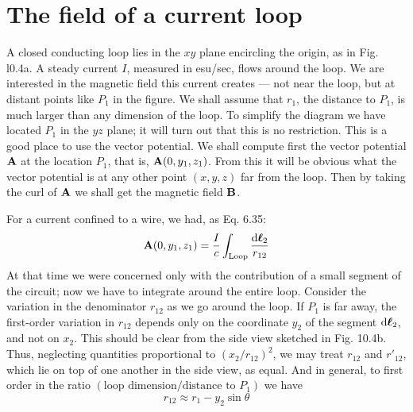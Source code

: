 \section{The field of a current loop}

A closed conducting loop lies in the $xy$ plane encircling the origin,
as in Fig. l0.4a. A steady current $I$, measured in esu/sec, flows
around the loop. We are interested in the magnetic field this current
creates --- not near the loop, but at distant points like $P_1$ in the figure.
We shall assume that $r_1$, the distance to $P_1$, is much larger than any
dimension of the loop. To simplify the diagram we have located $P_1$
in the $yz$ plane; it will turn out that this is no restriction. This is a
good place to use the vector potential. We shall compute first the
vector potential $\mathbf{A}$ at the location $P_1$, that is, $\mathbf{A}(0,y_1,z_1)$. From this
it will be obvious what the vector potential is at any other point
$(x,y,z)$ far from the loop. Then by taking the curl of $\mathbf{A}$ we shall get
the magnetic field $\mathbf{B}$.

For a current confined to a wire, we had, as Eq. 6.35:
\begin{equation}
  \mathbf{A}(0,y_1,z_1) = \frac{I}{c}\int_\text{Loop} \frac{\operatorname{d\!}\boldsymbol{\ell}_2}{r_{12}}
\end{equation}
At that time we were concerned only with the contribution of a small
segment of the circuit; now we have to integrate around the entire
loop. Consider the variation in the denominator $r_{12}$ as we go around
the loop. If $P_1$ is far away, the first-order variation in $r_{12}$ depends
only on the coordinate $y_2$ of the segment $\operatorname{d\!}\boldsymbol{\ell}_2$, and not on $x_2$. This
should be clear from the side view sketched in Fig. 10.4b. Thus,
neglecting quantities proportional to $(x_2/r_{12})^2$, we may treat $r_{12}$
and $r'_{12}$, which lie on top of one another in the side view, as equal.
And in general, to first order in the ratio 
$(\text{loop dimension}/\text{distance to $P_1$})$ we have
\begin{equation}
  r_{12} \approx r_1 - y_2\sin\theta
\end{equation}

